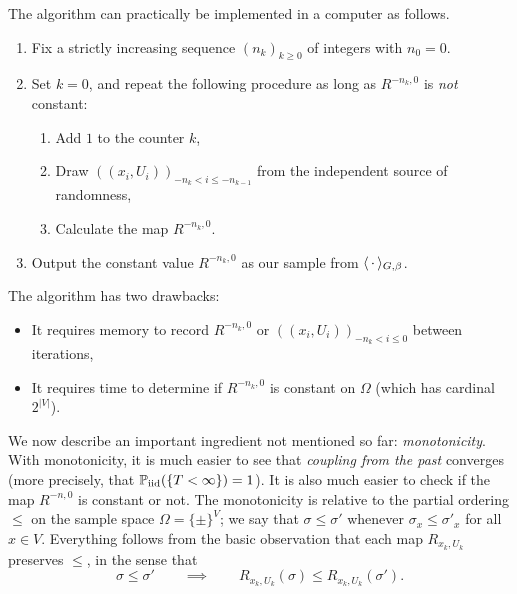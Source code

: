 \begin{remark}
    The algorithm can practically be implemented in a computer as follows.
    \begin{enumerate}
        \item Fix a strictly increasing sequence $(n_k)_{k\geq 0}$ of integers with $n_0=0$.
        \item Set $k=0$, and repeat the following procedure as long as $R^{-n_k,0}$ is
            \emph{not} constant:
            \begin{enumerate}
                \item Add $1$ to the counter $k$,
                \item Draw $((x_i,U_i))_{-n_k< i\leq -n_{k-1}}$ from the independent
                    source of randomness,
                \item Calculate the map $R^{-n_k,0}$.
            \end{enumerate}
        \item Output the constant value $R^{-n_k,0}$ as our sample from
            $\langle\,\cdot\,\rangle_{G,\beta}$.
    \end{enumerate}
\end{remark}

The algorithm has two drawbacks:
\begin{itemize}
    \item It requires memory to record $R^{-n_k,0}$ or $((x_i,U_i))_{-n_k< i\leq 0}$
        between iterations,
    \item It requires time to determine if $R^{-n_k,0}$ is constant on $\Omega$ (which
        has cardinal $2^{|V|}$).
\end{itemize}

We now describe an important ingredient not mentioned so far: \emph{monotonicity}.
With monotonicity, it is much easier to see that \emph{coupling from the past}
converges (more precisely, that $\mathbb P_{\operatorname{iid}}(\{T<\infty\})=1$).
It is also much easier to check if the map $R^{-n,0}$ is constant or not.
The monotonicity is relative to the partial ordering $\leq$
on the sample space $\Omega=\{\pm\}^V$;
we say that $\sigma\leq\sigma'$ whenever $\sigma_x\leq\sigma'_x$ for all $x\in V$.
Everything follows from the basic observation that each map $R_{x_k,U_k}$ preserves
$\leq$, in the sense that
\[
    \sigma\leq\sigma' \qquad \implies \qquad R_{x_k,U_k}(\sigma)\leq R_{x_k,U_k}(\sigma').
\]

